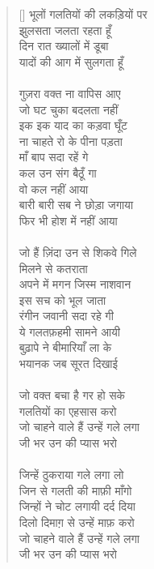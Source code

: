 \begin{verse}[\versewidth]\texthindi{
भूलों गलतियों की लकड़ियों पर\\
झुलसता जलता रहता हूँ\\
दिन रात ख्यालों में डूबा\\
यादों की आग में सुलगता हूँ \\
\\
गुज़रा वक्त ना वापिस आए\\
जो घट चुका बदलता नहीं\\
इक इक याद का कड़वा घूँट\\
ना चाहते रो के पीना पड़ता\\
माँ बाप सदा रहें गे\\
कल उन संग बैठूँ गा\\
वो कल नहीं आया\\
बारी बारी सब ने छोड़ा जगाया\\
फिर भी होश में नहीं आया\\
\\
जो हैं ज़िंदा उन से शिकवे गिले\\
मिलने से कतराता\\
अपने में मगन जिस्म नाशवान\\
इस सच को भूल जाता\\
रंगीन जवानी सदा रहे गी\\
ये गलतफ़हमी सामने आयी\\
बुढ़ापे ने बीमारियाँ ला के\\
भयानक जब सूरत दिखाई\\
\\
जो वक्त बचा है गर हो सके\\
गलतियों का एहसास करो\\
जो चाहने वाले हैं उन्हें गले लगा\\
जी भर उन की प्यास भरो\\
\\
जिन्हें ठुकराया गले लगा लो\\
जिन से गलती की माफ़ी माँगो\\
जिन्हों ने चोट लगायी दर्द दिया\\
दिलो दिमाग़ से उन्हें माफ़ करो\\
जो चाहने वाले हैं उन्हें गले लगा\\
जी भर उन की प्यास भरो
}\end{verse}

